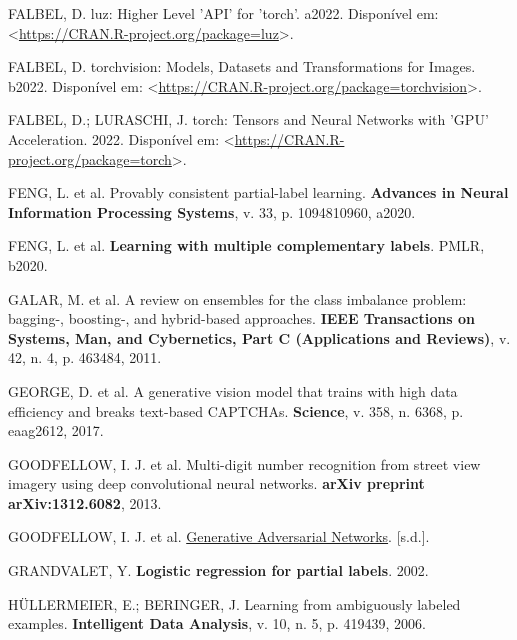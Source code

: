\documentclass[12pt,twoside,brazilian]{book}
\newlength{\cslhangindent}
\newlength{\cslentryspacingunit} %
\newenvironment{CSLReferences}[2] %
 {%
  \setlength{\parindent}{0pt}
  \ifodd #1
  \let\oldpar\par
  \def\par{\hangindent=\cslhangindent\oldpar}
  \fi
  \setlength{\parskip}{#2\cslentryspacingunit}
 }%
 {}
\begin{document}
\begin{CSLReferences}{0}{1}
\leavevmode{}%
FALBEL, D. luz: Higher Level 'API' for 'torch'. a2022. Disponível em:
\textless{}\url{https://CRAN.R-project.org/package=luz}\textgreater.

\leavevmode{}%
FALBEL, D. torchvision: Models, Datasets and Transformations for Images.
b2022. Disponível em:
\textless{}\url{https://CRAN.R-project.org/package=torchvision}\textgreater.

\leavevmode{}%
FALBEL, D.; LURASCHI, J. torch: Tensors and Neural Networks with 'GPU'
Acceleration. 2022. Disponível em:
\textless{}\url{https://CRAN.R-project.org/package=torch}\textgreater.

\leavevmode{}%
FENG, L. et al. Provably consistent partial-label learning.
\textbf{Advances in Neural Information Processing Systems}, v. 33, p.
1094810960, a2020.

\leavevmode{}%
FENG, L. et al. \textbf{Learning with multiple complementary labels}.
PMLR, b2020.

\leavevmode{}%
GALAR, M. et al. A review on ensembles for the class imbalance problem:
bagging-, boosting-, and hybrid-based approaches. \textbf{IEEE
Transactions on Systems, Man, and Cybernetics, Part C (Applications and
Reviews)}, v. 42, n. 4, p. 463484, 2011.

\leavevmode{}%
GEORGE, D. et al. A generative vision model that trains with high data
efficiency and breaks text-based CAPTCHAs. \textbf{Science}, v. 358, n.
6368, p. eaag2612, 2017.

\leavevmode{}%
GOODFELLOW, I. J. et al. Multi-digit number recognition from street view
imagery using deep convolutional neural networks. \textbf{arXiv preprint
arXiv:1312.6082}, 2013.

\leavevmode{}%
GOODFELLOW, I. J. et al.
\href{https://doi.org/10.48550/arXiv.1406.2661}{Generative Adversarial
Networks}. {[}s.d.{]}.

\leavevmode{}%
GRANDVALET, Y. \textbf{Logistic regression for partial labels}. 2002.

\leavevmode{}%
HÜLLERMEIER, E.; BERINGER, J. Learning from ambiguously labeled
examples. \textbf{Intelligent Data Analysis}, v. 10, n. 5, p. 419439,
2006.


\end{CSLReferences}
\end{document}
